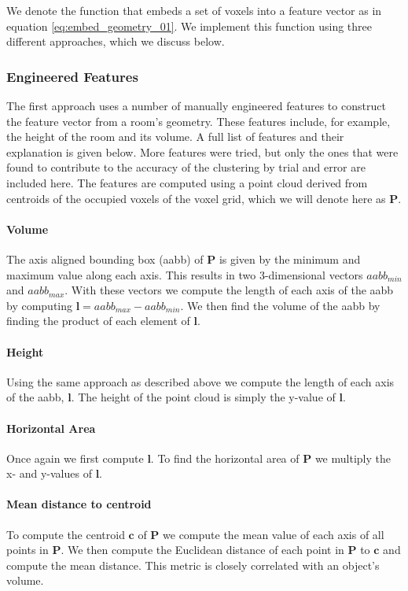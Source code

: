 We denote the function that embeds a set of voxels into a feature vector as in equation \ref{eq:embed_geometry_01}. We implement this function using three different approaches, which we discuss below.

\subsubsection{Engineered Features}
The first approach uses a number of manually engineered features to construct the feature vector from a room's geometry. These features include, for example, the height of the room and its volume. A full list of features and their explanation is given below. More features were tried, but only the ones that were found to contribute to the accuracy of the clustering by trial and error are included here. The features are computed using a point cloud derived from centroids of the occupied voxels of the voxel grid, which we will denote here as \(\mathbf{P}\).

\paragraph{Volume}
The axis aligned bounding box (aabb) of \(\mathbf{P}\) is given by the minimum and maximum value along each axis. This results in two 3-dimensional vectors \(aabb_{min}\) and \(aabb_{max}\). With these vectors we compute the length of each axis of the aabb by computing \(\mathbf{l} = aabb_{max} - aabb_{min}\). We then find the volume of the aabb by finding the product of each element of \(\mathbf{l}\).

\paragraph{Height} 
Using the same approach as described above we compute the length of each axis of the aabb, \(\mathbf{l}\). The height of the point cloud is simply the y-value of \(\mathbf{l}\).

\paragraph{Horizontal Area} 
Once again we first compute \(\mathbf{l}\). To find the horizontal area of \(\mathbf{P}\) we multiply the x- and y-values of \(\mathbf{l}\). 

\paragraph{Mean distance to centroid} 
To compute the centroid \(\mathbf{c}\) of \(\mathbf{P}\) we compute the mean value of each axis of all points in \(\mathbf{P}\). We then compute the Euclidean distance of each point in \(\mathbf{P}\) to \(\mathbf{c}\) and compute the mean distance. This metric is closely correlated with an object's volume. 


